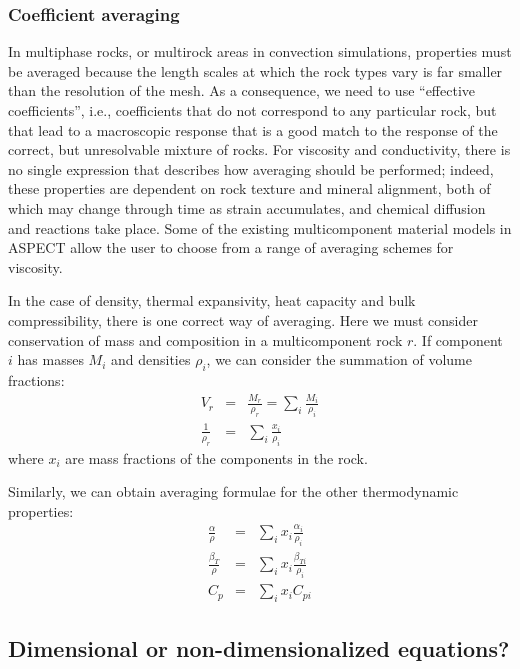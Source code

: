 \documentclass{article}
\newcommand{\aspect}{\textsc{ASPECT}}
\begin{document}
\subsubsection{Coefficient averaging}
In multiphase rocks, or multirock areas in convection simulations, properties must be averaged
because the length scales at which the rock types vary is far smaller than the resolution of the mesh.
As a consequence, we need to use ``effective coefficients'', i.e., coefficients that do not
correspond to any particular rock, but that lead to a macroscopic response that is a good match
to the response of the correct, but unresolvable mixture of rocks.
For viscosity and conductivity, there is no single expression that describes how averaging should
be performed; indeed, these properties are dependent on rock texture and mineral alignment,
both of which may change through time as strain accumulates, and chemical diffusion and
reactions take place. Some of the existing multicomponent material models in \aspect{} allow the
user to choose from a range of averaging schemes for viscosity.

In the case of density, thermal expansivity, heat capacity and bulk compressibility, there is
one correct way of averaging. Here we must consider conservation of mass and composition in a
multicomponent rock $r$. If component $i$ has masses $M_i$ and densities $\rho_i$, we
can consider the summation of volume fractions:
\begin{eqnarray}
  V_r &=& \frac{M_r}{\rho_r} = \sum_i \frac{M_i}{\rho_i} \\
  \frac{1}{\rho_r} &=& \sum_i \frac{x_i}{\rho_i}
\end{eqnarray}
where $x_i$ are mass fractions of the components in the rock.

Similarly, we can obtain averaging formulae for the other thermodynamic properties:
\begin{eqnarray}
  \frac{\alpha}{\rho} &=& \sum_i x_i \frac{\alpha_i}{\rho_{i}} \\
  \frac{\beta_T}{\rho} &=& \sum_i x_i \frac{\beta_{Ti}}{\rho_{i}} \\
  C_p &=& \sum_i x_i C_{pi}
\end{eqnarray}



\subsection{Dimensional or non-dimensionalized equations?}
\label{sec:non-dimensional}
\end{document}
